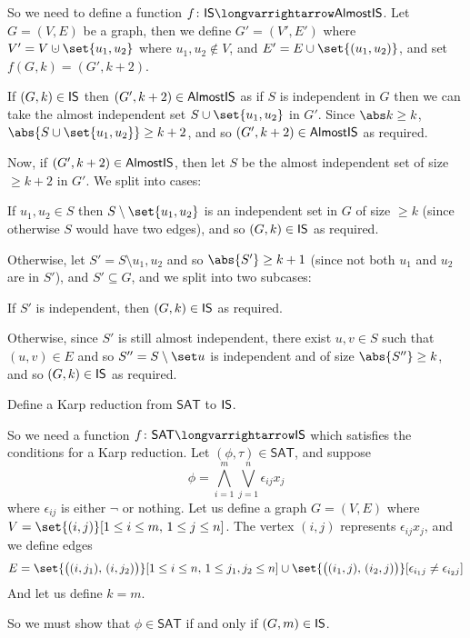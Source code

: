 \documentclass[10pt]{article}
\let\longto=\longvarrightarrow
\begin{document}
So we need to define a function $f\colon\is\longto\almostIS$.
Let $G=(V,E)$ be a graph, then we define $G'=(V',E')$ where $V'=V\dcup\set{u_1,u_2}$ where $u_1,u_2\notin V$, and $E'=E\cup\set{(u_1,u_2)}$, and set $f(G,k)=(G',k+2)$.

If $(G,k)\in\mathsf{IS}$ then $(G',k+2)\in\mathsf{AlmostIS}$ as if $S$ is independent in $G$ then we can take the almost independent set $S\cup\set{u_1,u_2}$ in $G'$.
Since $\abs k\geq k$, $\abs{S\cup\set{u_1,u_2}}\geq k+2$, and so $(G',k+2)\in\mathsf{AlmostIS}$ as required.

Now, if $(G',k+2)\in\mathsf{AlmostIS}$, then let $S$ be the almost independent set of size $\geq k+2$ in $G'$.
We split into cases:
\benum
    \item If $u_1,u_2\in S$ then $S\setminus\set{u_1,u_2}$ is an independent set in $G$ of size $\geq k$ (since otherwise $S$ would have two edges), and so $(G,k)\in\mathsf{IS}$ as required.
    \item Otherwise, let $S'=S\setminus{u_1,u_2}$ and so $\abs{S'}\geq k+1$ (since not both $u_1$ and $u_2$ are in $S'$), and $S'\subseteq G$, and we split into two subcases:
    \benum
        \item If $S'$ is independent, then $(G,k)\in\mathsf{IS}$ as required.
        \item Otherwise, since $S'$ is still almost independent, there exist $u,v\in S$ such that $(u,v)\in E$ and so $S''=S\setminus\set u$ is independent and of size $\abs{S''}\geq k$, and so
        $(G,k)\in\mathsf{IS}$ as required.
    \eenum
\eenum

\def\sat{\mathsf{SAT}}
\begin{exercise*}

    Define a Karp reduction from $\sat$ to $\mathsf{IS}$.

\end{exercise*}

So we need a function $f\colon\sat\longto\is$ which satisfies the conditions for a Karp reduction.
Let $(\phi,\tau)\in\sat$, and suppose
\[ \phi = \bigwedge_{i=1}^m\bigvee_{j=1}^n\epsilon_{ij}x_j \]
where $\epsilon_{ij}$ is either $\neg$ or nothing.
Let us define a graph $G=(V,E)$ where $V=\set{(i,j)}[1\leq i\leq m,\,1\leq j\leq n]$.
The vertex $(i,j)$ represents $\epsilon_{ij}x_j$, and we define edges
\[ E = \set{\bigl((i,j_1),\,(i,j_2)\bigr)}[1\leq i\leq n,\,1\leq j_1,j_2\leq n]\cup\set{\bigl((i_1,j),\,(i_2,j)\bigr)}[\epsilon_{i_1j}\neq\epsilon_{i_2j}] \]
And let us define $k=m$.

So we must show that $\phi\in\sat$ if and only if $(G,m)\in\mathsf{IS}$.
\end{document}
